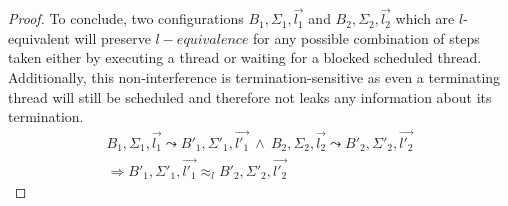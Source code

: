 \documentclass[10pt,preprint]{sigplanconf}
\newtheorem{theorem}{Theorem}
\begin{document}
\begin{proof}
To conclude, two configurations $B_1, \Sigma_1, \vec{l_1}$ and $B_2, \Sigma_2, \vec{l_2}$ which are $l$-equivalent will preserve $l-equivalence$ for any possible combination of steps taken either by executing a thread or waiting for a blocked scheduled thread.  Additionally, this non-interference is termination-sensitive as even a terminating thread will still be scheduled and therefore not leaks any information about its termination.
\begin{align*}
  B_1,\Sigma_1, \vec{l_1} \leadsto B'_1,\Sigma'_1, \vec{l'_1} ~\wedge~B_2,\Sigma_2,\vec{l_2} \leadsto B'_2,\Sigma'_2, \vec{l'_2} \\
  \Rightarrow B'_1,\Sigma'_1, \vec{l'_1} \approx_l B'_2,\Sigma'_2, \vec{l'_2}
\end{align*}







\end{proof}
\end{document}
